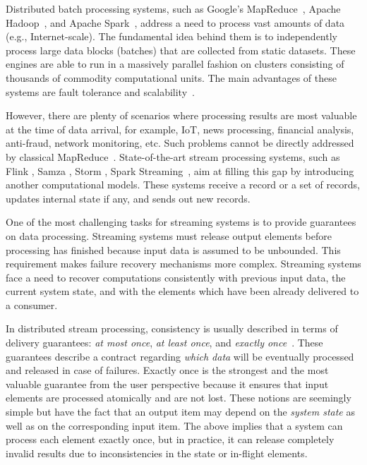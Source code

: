
\label {fs-intro-seciton}

Distributed batch processing systems, such as Google's MapReduce~\cite{Dean:2008:MSD:1327452.1327492}, Apache Hadoop~\cite{hadoop2009hadoop}, and Apache Spark~\cite{Zaharia:2016:ASU:3013530.2934664}, address a need to process vast amounts of data (e.g., Internet-scale). The fundamental idea behind them is to independently process large data blocks (batches) that are collected from static datasets. These engines are able to run in a massively parallel fashion on clusters consisting of thousands of commodity computational units. The main advantages of these systems are fault tolerance and scalability~\cite{borthakur2011apache}.

However, there are plenty of scenarios where processing results are most valuable at the time of data arrival, for example, IoT, news processing, financial analysis, anti-fraud, network monitoring, etc. Such problems cannot be directly addressed by classical MapReduce~\cite{Doulkeridis:2014:SLA:2628707.2628782}. State-of-the-art stream processing systems, such as Flink \cite{carbone2015apache}, Samza \cite{Noghabi:2017:SSS:3137765.3137770}, Storm \cite{apache:storm}, Spark Streaming~\cite{Zaharia:2012:DSE:2342763.2342773}, aim at filling this gap by introducing another computational models. 
These systems receive a record or a set of records, updates internal state if any, and sends out new records. %

One of the most challenging tasks for streaming systems is to provide guarantees on data processing. Streaming systems must release output elements before processing has finished because input data is assumed to be unbounded. This requirement makes failure recovery mechanisms more complex. Streaming systems face a need to recover computations consistently with previous input data, the current system state, and with the elements which have been already delivered to a consumer. 

In distributed stream processing, consistency is usually described in terms of delivery guarantees: {\em at most once}, {\em at least once}, and {\em exactly once}~\cite{carbone2015apache}. These guarantees describe a contract regarding {\em which data} will be eventually processed and released in case of failures. Exactly once is the strongest and the most valuable guarantee from the user perspective because it ensures that input elements are processed atomically and are not lost. These notions are seemingly simple but have the fact that an output item may depend on the {\em system state} as well as on the corresponding input item. The above implies that a system can process each element exactly once, but in practice, it can release completely invalid results due to inconsistencies in the state or in-flight elements.

